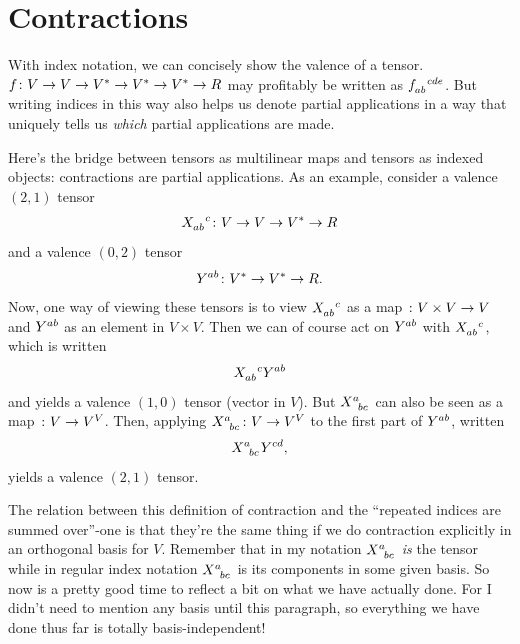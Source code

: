 \documentclass[english, 12pt]{article}
\begin{document}
\section{Contractions}%
\label{sec:contractions}

With index notation, we can concisely show the valence of a tensor.
$f \colon V \to V \to {V}^{*} \to {V}^{*} \to {V}^{*} \to R$ may profitably be written as $\tensor{f}{_{a b}^{c d e}}$.
But writing indices in this way also helps us denote partial applications in a way that uniquely tells us \emph{which} partial applications are made.

Here's the bridge between tensors as multilinear maps and tensors as indexed objects: contractions are partial applications.
As an example, consider a valence $(2, 1)$ tensor
\begin{align*}
	\tensor{X}{_a_b^c} \from V \to V \to \dual V \to R
\end{align*}
and a valence $(0, 2)$ tensor
\begin{align*}
	\tensor{Y}{^a^b} \from \dual V \to \dual V \to R.
\end{align*}
Now, one way of viewing these tensors is to view $\tensor{X}{_a_b^c}$ as a map $\colon V \times V \to V$ and $\tensor{Y}{^a^b}$ as an element in $V \times V$.
Then we can of course act on $\tensor{Y}{^a^b}$ with $\tensor{X}{_a_b^c}$,
which is written
\begin{align*}
	\tensor{X}{_a_b^c} \tensor{Y}{^a^b}
\end{align*}
and yields a valence $(1, 0)$ tensor (vector in $V$).
But $\tensor{X}{^a_b_c}$ can also be seen as a map $\colon V \to V^V$.
Then, applying $\tensor{X}{^a_b_c}\from V \to V^V$ to the first part of $\tensor{Y}{^a^b}$, written
\begin{align*}
	\tensor{X}{^a_b_c} \tensor{Y}{^c^d},
\end{align*}
yields a valence $(2, 1)$ tensor.

The relation between this definition of contraction and the \enquote{repeated indices are summed over}-one is that they're the same thing if we do contraction explicitly in an orthogonal basis for $V$.
Remember that in my notation $\tensor{X}{^a_b_c}$ \emph{is} the tensor while in regular index notation $\tensor{X}{^a_b_c}$ is its components in some given basis.
So now is a pretty good time to reflect a bit on what we have actually done.
For I didn't need to mention any basis until this paragraph, so everything we have done thus far is totally basis-independent!
\end{document}
